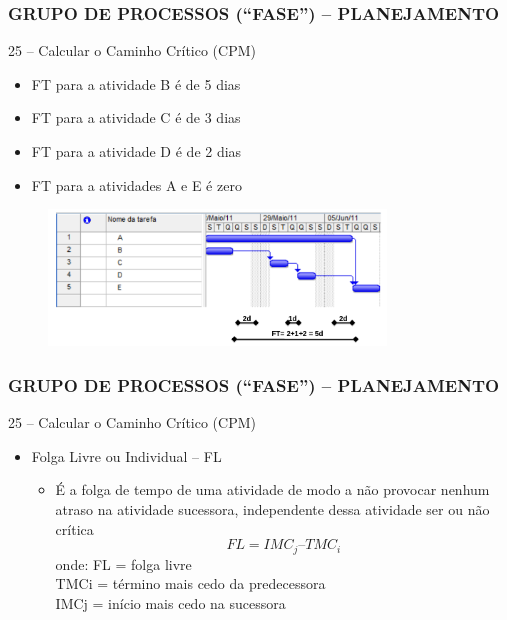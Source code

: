 \begin{frame}
 \frametitle{GRUPO DE PROCESSOS (“FASE”) – PLANEJAMENTO}
25 – Calcular o Caminho Crítico (CPM)
  \begin{itemize}
   \item FT para a atividade B é de 5 dias
   \item FT para a atividade C é de 3 dias
   \item FT para a atividade D é de 2 dias
   \item FT para a atividades A e E é zero
      \end{itemize}
  \begin{figure}
   \centering
   \includegraphics[width = 0.8\textwidth]{figs/fig10.png}
  \end{figure}
\end{frame}

\begin{frame}
 \frametitle{GRUPO DE PROCESSOS (“FASE”) – PLANEJAMENTO}
25 – Calcular o Caminho Crítico (CPM)
  \begin{itemize}
   \item Folga Livre ou Individual – FL
   \begin{itemize}
    \item É a folga de tempo de uma atividade de modo a não provocar nenhum atraso na atividade sucessora, independente dessa atividade ser ou não crítica
    \begin{equation}
      FL = IMC_j – TMC_i
    \end{equation}
onde: FL = folga livre \\
            TMCi = término mais cedo da predecessora \\
            IMCj = início mais cedo na sucessora \\
   \end{itemize}
  \end{itemize}
\end{frame}

